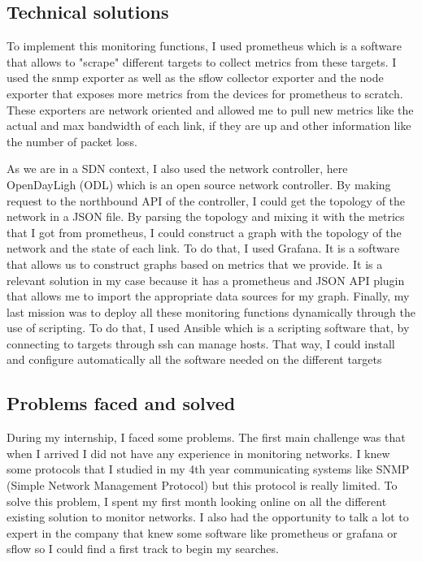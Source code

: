 \subsection{Technical solutions}

To implement this monitoring functions, I used prometheus which is a software that allows to
"scrape" different targets to collect metrics from these targets. I used the snmp exporter as well as
the sflow collector exporter and the node exporter that exposes more metrics from the devices for
prometheus to scratch. These exporters are network oriented and allowed me to pull new metrics
like the actual and max bandwidth of each link, if they are up and other information like the number
of packet loss.
\smallskip

As we are in a SDN context, I also used the network controller, here OpenDayLigh (ODL) which
is an open source network controller. By making request to the northbound API of the controller,
I could get the topology of the network in a JSON file. By parsing the topology and mixing it with
the metrics that I got from prometheus, I could construct a graph with the topology of the network
and the state of each link. To do that, I used Grafana. It is a software that allows us to construct
graphs based on metrics that we provide. It is a relevant solution in my case because it has a prometheus and JSON API plugin that allows me to import the appropriate data sources for my graph.
Finally, my last mission was to deploy all these monitoring functions dynamically through the
use of scripting. To do that, I used Ansible which is a scripting software that, by connecting to
targets through ssh can manage hosts. That way, I could install and configure automatically all the
software needed on the different targets


\subsection{Problems faced and solved}

During my internship, I faced some problems. The first main challenge was that when I arrived
I did not have any experience in monitoring networks. I knew some protocols that I studied in
my 4th year communicating systems like SNMP (Simple Network Management Protocol) but this
protocol is really limited. To solve this problem, I spent my first month looking online on all the
different existing solution to monitor networks. I also had the opportunity to talk a lot to expert
in the company that knew some software like prometheus or grafana or sflow so I could find a first
track to begin my searches.
\smallskip


